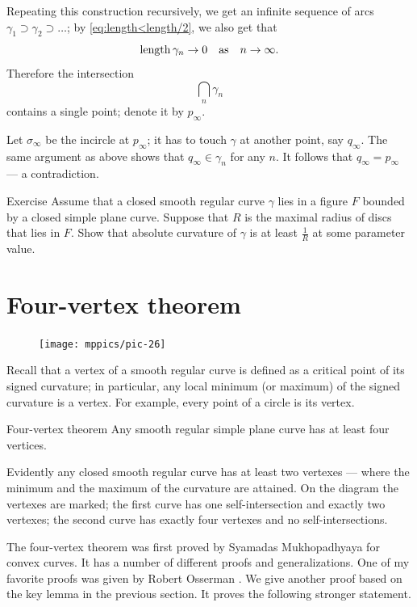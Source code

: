 Repeating this construction recursively,
we get an infinite sequence of arcs $\gamma_1\supset \gamma_2\supset\dots$;
by \ref{eq:length<length/2}, we also get that 
\[\mathop{\rm length}\nolimits\gamma_n\to0\quad\text{as}\quad n\to\infty.\] 
Therefore the intersection 
\[\bigcap_n\gamma_n\]
contains a single point; denote it by $p_\infty$.

Let $\sigma_\infty$ be the incircle at $p_\infty$; it has to touch $\gamma$ at another point, say $q_\infty$.
The same argument as above shows that $q_\infty\in\gamma_n$ for any $n$.
It follows that $q_\infty =p_\infty$ --- a contradiction.
\qeds

\begin{thm}{Exercise}\label{ex:moon-rad}
Assume that a closed smooth regular curve $\gamma$ lies in a figure $F$ bounded by a closed simple plane curve.
Suppose that $R$ is the maximal radius of discs that lies in $F$.
Show that absolute curvature of $\gamma$ is at least $\tfrac1R$ at some parameter value.
\end{thm}


\section*{Four-vertex theorem}

{

\begin{figure}
\vskip-0mm
\centering
\texttt{[image: mppics/pic-26]}
\vskip0mm
\end{figure}

Recall that a vertex of a smooth regular curve is defined as a critical point of its signed curvature;
in particular, any local minimum (or maximum) of the signed curvature is a vertex.
For example, every point of a circle is its vertex.

\begin{thm}{Four-vertex theorem}\label{thm:4-vert}
Any smooth regular simple plane curve has at least four
vertices.
\end{thm}

}

Evidently any closed smooth regular curve has at least two vertexes --- where the minimum and the maximum of the curvature are attained.
On the diagram the vertexes are marked;
the first curve has one self-intersection and exactly two vertexes;
the second curve has exactly four vertexes and no self-intersections.

The four-vertex theorem was first proved by Syamadas Mukhopadhyaya \cite{mukhopadhyaya} for convex curves.
It has a number of different proofs and generalizations.
One of my favorite proofs was given by Robert Osserman \cite{osserman}.
We give another proof based on the key lemma in the previous section.
It proves the following stronger statement.

